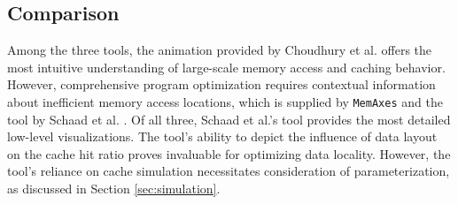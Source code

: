 \subsection{Comparison}\label{sec:comparison}
Among the three tools, the animation provided by Choudhury et al. \cite{choudhury2011abstract} offers the most intuitive understanding of large-scale memory access and caching behavior. However, comprehensive program optimization requires contextual information about inefficient memory access locations, which is supplied by \texttt{MemAxes} \cite{gimenez2017memaxes} and the tool by Schaad et al. \cite{schaad2021boosting}. Of all three, Schaad et al.'s tool provides the most detailed low-level visualizations. The tool's ability to depict the influence of data layout on the cache hit ratio proves invaluable for optimizing data locality. However, the tool's reliance on cache simulation necessitates consideration of parameterization, as discussed in Section \ref{sec:simulation}.